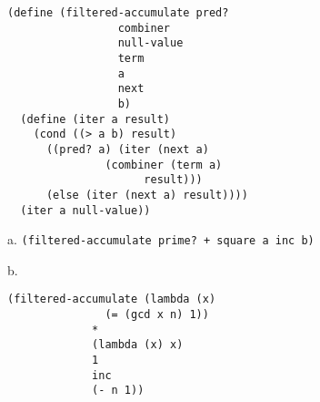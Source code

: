 \documentclass[a4paper,12pt]{article}
\begin{document}
\noindent
\begin{lstlisting}
(define (filtered-accumulate pred?
			     combiner
			     null-value
			     term
			     a
			     next
			     b)
  (define (iter a result)
    (cond ((> a b) result)
	  ((pred? a) (iter (next a)
			   (combiner (term a)
				     result)))
	  (else (iter (next a) result))))
  (iter a null-value))
\end{lstlisting}

\medskip \noindent
a. \lstinline!(filtered-accumulate prime? + square a inc b)!

\medskip \noindent
b.
\begin{lstlisting}
(filtered-accumulate (lambda (x)
		       (= (gcd x n) 1))
		     *
		     (lambda (x) x)
		     1
		     inc
		     (- n 1))
\end{lstlisting}
\end{document}
